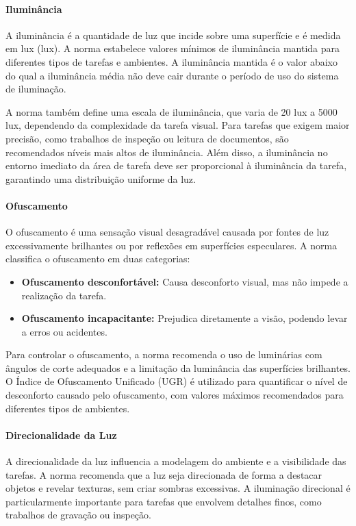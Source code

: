 \paragraph{Iluminância}

A iluminância é a quantidade de luz que incide sobre uma superfície e é medida em lux (\gls{lux}). A norma estabelece valores mínimos de iluminância mantida para diferentes tipos de tarefas e ambientes. A iluminância mantida é o valor abaixo do qual a iluminância média não deve cair durante o período de uso do sistema de iluminação.

A norma também define uma escala de iluminância, que varia de 20 \gls{lux} a 5000 \gls{lux}, dependendo da complexidade da tarefa visual. Para tarefas que exigem maior precisão, como trabalhos de inspeção ou leitura de documentos, são recomendados níveis mais altos de iluminância. Além disso, a iluminância no entorno imediato da área de tarefa deve ser proporcional à iluminância da tarefa, garantindo uma distribuição uniforme da luz.

\paragraph{Ofuscamento}
O ofuscamento é uma sensação visual desagradável causada por fontes de luz excessivamente brilhantes ou por reflexões em superfícies especulares. A norma classifica o ofuscamento em duas categorias:

\begin{itemize}
    \item \textbf{Ofuscamento desconfortável:} Causa desconforto visual, mas não impede a realização da tarefa.
    \item \textbf{Ofuscamento incapacitante:} Prejudica diretamente a visão, podendo levar a erros ou acidentes.
\end{itemize}

Para controlar o ofuscamento, a norma recomenda o uso de luminárias com ângulos de corte adequados e a limitação da luminância das superfícies brilhantes. O Índice de Ofuscamento Unificado (\gls{UGR}) é utilizado para quantificar o nível de desconforto causado pelo ofuscamento, com valores máximos recomendados para diferentes tipos de ambientes.

\paragraph{Direcionalidade da Luz}

A direcionalidade da luz influencia a modelagem do ambiente e a visibilidade das tarefas. A norma recomenda que a luz seja direcionada de forma a destacar objetos e revelar texturas, sem criar sombras excessivas. A iluminação direcional é particularmente importante para tarefas que envolvem detalhes finos, como trabalhos de gravação ou inspeção.


